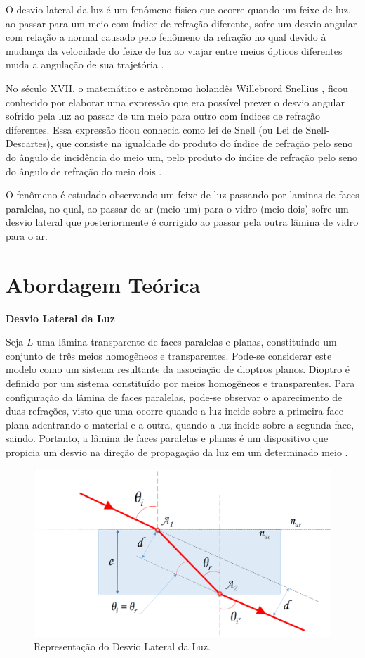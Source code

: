 \documentclass[
	12pt,				%
	oneside,			%
	a4paper,			%
	english,			%
	french,				%
	spanish,			%
	brazil				%
	]{abntex2}
\begin{document}
O desvio lateral da luz é um fenômeno físico que ocorre quando um feixe de luz, ao passar para um meio com índice de refração diferente, sofre um desvio angular com relação a normal causado pelo fenômeno da refração no qual devido à mudança da velocidade do feixe de luz ao viajar entre meios ópticos diferentes muda a angulação de sua trajetória \cite{merefrac}.

No século XVII, o matemático e astrônomo holandês Willebrord Snellius \cite{wikiroyen}, ficou conhecido por elaborar uma expressão que era possível prever o desvio angular sofrido pela luz ao passar de um meio para outro com índices de refração diferentes. Essa expressão ficou conhecia como lei de Snell (ou Lei de Snell-Descartes), que consiste na igualdade do produto do índice de refração pelo seno do ângulo de incidência do meio um, pelo produto do índice de refração pelo seno do ângulo de refração do meio dois \cite{wikisneel}.

O fenômeno é estudado observando um feixe de luz passando por laminas de faces paralelas, no qual, ao passar do ar (meio um) para o vidro (meio dois) sofre um desvio lateral que posteriormente é corrigido ao passar pela outra lâmina de vidro para o ar.

\chapter{Abordagem Teórica}

\textbf{Desvio Lateral da Luz}

Seja $L$ uma lâmina transparente de faces paralelas e planas, constituindo um conjunto de três meios homogêneos e transparentes. Pode-se considerar este modelo como um sistema resultante da associação de dioptros planos. Dioptro é definido por um sistema constituído por meios homogêneos e transparentes.
Para configuração da lâmina de faces paralelas, pode-se observar o aparecimento de duas refrações, visto que uma ocorre quando a luz incide sobre a primeira face plana adentrando o material e a outra, quando a luz incide sobre a segunda face, saindo. Portanto, a lâmina de faces paralelas e planas é um dispositivo que propicia um desvio na direção de propagação da luz em um determinado meio \cite{resnick4}.

\begin{figure}[htb]
	\centering
	\includegraphics[scale=0.3]{Imagem1.png}
	\caption{Representação do Desvio Lateral da Luz.}
	\label{figura-1}
\end{figure}
\end{document}
